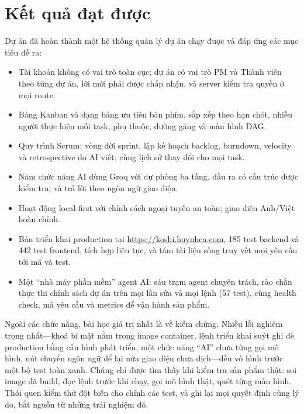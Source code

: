 \documentclass[../main.tex]{subfiles}
\begin{document}
\section*{Kết quả đạt được}
Dự án đã hoàn thành một hệ thống quản lý dự án chạy được và đáp ứng các mục tiêu đề ra:
\begin{itemize}
  \item Tài khoản không có vai trò toàn cục; dự án có vai trò PM và Thành viên theo từng dự án, lời
        mời phải được chấp nhận, và server kiểm tra quyền ở mọi route.
  \item Bảng Kanban và dạng bảng ưu tiên bàn phím, sắp xếp theo hạn chót, nhiều người thực hiện mỗi
        task, phụ thuộc, đường găng và màn hình DAG.
  \item Quy trình Scrum: vòng đời sprint, lập kế hoạch backlog, burndown, velocity và retrospective
        do AI viết; cùng lịch sử thay đổi cho mọi task.
  \item Năm chức năng AI dùng Groq với dự phòng ba tầng, đầu ra có cấu trúc được kiểm tra, và trả lời
        theo ngôn ngữ giao diện.
  \item Hoạt động local-first với chính sách ngoại tuyến an toàn; giao diện Anh/Việt hoàn chỉnh.
  \item Bản triển khai production tại \url{https://koshi.huynhca.com}, 185 test backend và 442 test
        frontend, tích hợp liên tục, và tám tài liệu sống truy vết mọi yêu cầu tới mã và test.
  \item Một ``nhà máy phần mềm'' agent AI: sáu trạm agent chuyên trách, rào chắn thực thi chính sách
        dự án trên mọi lần sửa và mọi lệnh (57 test), cùng health check, mã yêu cầu và metrics để vận
        hành sản phẩm.
\end{itemize}

Ngoài các chức năng, bài học giá trị nhất là về kiểm chứng. Nhiều lỗi nghiêm trọng nhất---khoá bí
mật nằm trong image container, lệnh triển khai suýt ghi đè production bằng cấu hình phát triển, một
chức năng ``AI'' chưa từng gọi mô hình, nút chuyển ngôn ngữ để lại nửa giao diện chưa dịch---đều vô
hình trước một bộ test toàn xanh. Chúng chỉ được tìm thấy khi kiểm tra sản phẩm thật: soi image đã
build, đọc lệnh trước khi chạy, gọi mô hình thật, quét từng màn hình. Thói quen kiểm thử đột biến cho
chính các test, và ghi lại mọi quyết định cùng lý do, bắt nguồn từ những trải nghiệm đó.
\end{document}
